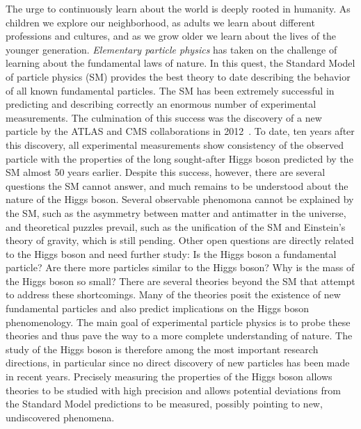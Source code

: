 
The urge to continuously learn about the world is deeply rooted in humanity.
As children we explore our neighborhood, as adults we learn about different professions and cultures, and as we grow older we learn about the lives of the younger generation. 
\emph{Elementary particle physics} has taken on the challenge of learning about the fundamental laws of nature. 
In this quest, the Standard Model of particle physics (SM) provides the best theory to date describing the behavior of all known fundamental particles. 
The SM has been extremely successful in predicting and describing correctly an enormous number of experimental measurements. 
The culmination of this success was the discovery of a new particle by the ATLAS and CMS collaborations in 2012~\cite{HIGG-2012-27,CMS-HIG-12-028}.
To date, ten years after this discovery, all experimental measurements show consistency of the observed particle with the properties of the long sought-after Higgs boson predicted by the SM almost 50 years earlier.
Despite this success, however, there are several questions the SM cannot answer, and much remains to be understood about the nature of the Higgs boson.
Several observable phenomona cannot be explained by the SM, such as the asymmetry between matter and antimatter in the universe, and theoretical puzzles prevail, such as the unification of the SM and Einstein's theory of gravity, which is still pending.
Other open questions are directly related to the Higgs boson and need further study: Is the Higgs boson a fundamental particle? Are there more particles similar to the Higgs boson? Why is the mass of the Higgs boson so small? 
There are several theories beyond the SM that attempt to address these shortcomings. 
Many of the theories posit the existence of new fundamental particles and also predict implications on the Higgs boson phenomenology.
The main goal of experimental particle physics is to probe these theories and thus pave the way to a more complete understanding of nature.
The study of the Higgs boson is therefore among the most important research directions, in particular since no direct discovery of new particles has been made in recent years.
Precisely measuring the properties of the Higgs boson allows theories to be studied with high precision and allows potential deviations from the Standard Model predictions to be measured, possibly pointing to new, undiscovered phenomena. 

